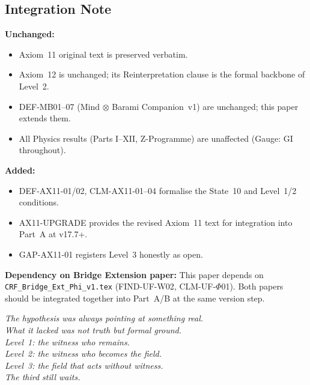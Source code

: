 \documentclass[12pt, a4paper]{article}
\begin{document}
\subsection{Integration Note}


\begin{keybox}[title={What Changes and What Does Not}]
\textbf{Unchanged:}
\begin{itemize}[leftmargin=*, itemsep=2pt]
\item Axiom~11 original text is preserved verbatim.
\item Axiom~12 is unchanged; its Reinterpretation clause is
  the formal backbone of Level~2.
\item DEF-MB01--07 (Mind $\otimes$ Barami Companion~v1)
  are unchanged; this paper extends them.
\item All Physics results (Parts I--XII, Z-Programme) are
  unaffected (Gauge: GI throughout).
\end{itemize}

\textbf{Added:}
\begin{itemize}[leftmargin=*, itemsep=2pt]
\item DEF-AX11-01/02, CLM-AX11-01--04 formalise the
  State~10 and Level~1/2 conditions.
\item AX11-UPGRADE provides the revised Axiom~11 text for
  integration into Part~A at v17.7+.
\item GAP-AX11-01 registers Level~3 honestly as open.
\end{itemize}

\textbf{Dependency on Bridge Extension paper:}
This paper depends on
\texttt{CRF\_Bridge\_Ext\_Phi\_v1.tex} (FIND-UF-W02,
CLM-UF-$\Phi$01). Both papers should be integrated
together into Part~A/B at the same version step.
\end{keybox}

\bigskip
\begin{center}
\textit{The hypothesis was always pointing at something real.\\
What it lacked was not truth but formal ground.\\
Level~1: the witness who remains.\\
Level~2: the witness who becomes the field.\\
Level~3: the field that acts without witness.\\
The third still waits.}
\end{center}
\end{document}
